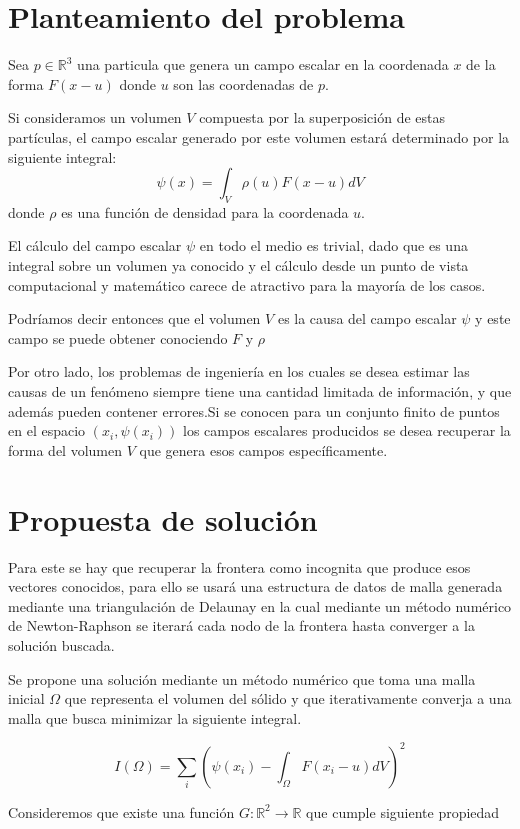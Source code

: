 
\section{Planteamiento del problema}

Sea $p \in \mathbb{R}^3$ una particula que genera un campo escalar en
la coordenada $x$ de la forma $F(x-u)$ donde $u$ son las coordenadas de $p$.

Si consideramos un volumen $V$ compuesta por la superposición de estas
partículas, el campo escalar generado por este volumen estará
determinado por la siguiente integral: $$\psi(x)=\int_V
\rho(u)F(x-u)dV$$ donde $\rho$ es una función de
densidad para la coordenada $u$.

El cálculo del campo escalar $\psi$ en todo el medio es trivial, dado
que es una integral sobre un volumen ya conocido y el cálculo desde un
punto de vista computacional y matemático carece de atractivo para la
mayoría de los casos.

Podríamos decir entonces que el volumen $V$ es la causa del campo
escalar $\psi$ y este campo se puede obtener conociendo $F$ y $\rho$

Por otro lado, los problemas de ingeniería en los cuales se desea
estimar las causas de un fenómeno siempre tiene una cantidad limitada
de información, y que además pueden contener errores.Si se conocen
para un conjunto finito de puntos en el espacio $(x_i,\psi(x_i))$ los
campos escalares producidos se desea recuperar la forma del volumen
$V$ que genera esos campos específicamente.


\section{Propuesta de solución}

Para este se hay que recuperar la frontera como incognita que produce
esos vectores conocidos, para ello se usará una estructura de datos de
malla generada mediante una triangulación de Delaunay en la cual
mediante un método numérico de Newton-Raphson se iterará cada nodo de
la frontera hasta converger a la solución buscada.

Se propone una solución mediante un método numérico que toma una malla
inicial $\Omega$ que representa el volumen del sólido y que
iterativamente converja a una malla que busca minimizar la siguiente
integral.

$$I(\Omega) = \sum_i(\psi(x_i) - \int_\Omega F(x_i-u)dV)^2$$

Consideremos que existe una función $G:\mathbb{R}^2\to \mathbb{R}$ que
cumple siguiente propiedad

